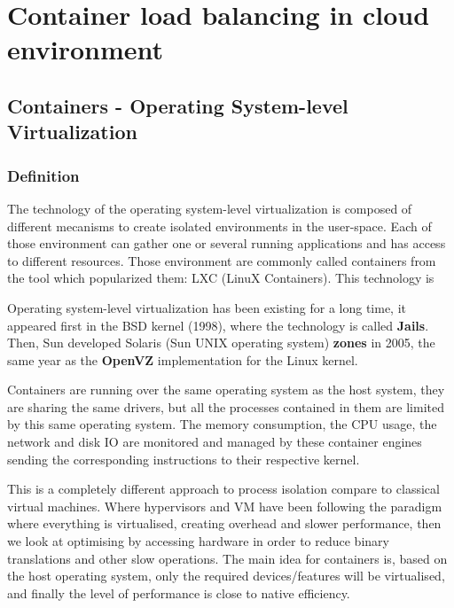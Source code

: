 \chapter{Container load balancing in cloud environment}
\label{mainidea}

\section{Containers - Operating System-level Virtualization}

\subsection{Definition}

The technology of the operating system-level virtualization is composed of
different mecanisms to create isolated environments in the user-space.  Each of
those environment can gather one or several running applications and has access
to different resources. Those environment are commonly called containers from
the tool which popularized them: LXC (LinuX Containers). This technology is 

Operating system-level virtualization has been existing for a long time, it
appeared first in the BSD kernel (1998), where the technology is called
\textbf{Jails}.  Then, Sun developed Solaris (Sun UNIX operating system)
\textbf{zones} in 2005, the same year as the \textbf{OpenVZ} implementation for
the Linux kernel.

Containers are running over the same operating system as the host system, they
are sharing the same drivers, but all the processes contained in them are
limited by this same operating system. The memory consumption, the CPU usage,
the network and disk IO are monitored and managed by these container engines
sending the corresponding instructions to their respective kernel. 

This is a completely different approach to process isolation compare to
classical virtual machines. Where hypervisors and VM have been following the
paradigm where everything is virtualised, creating overhead and slower
performance, then we look at optimising by accessing hardware in order to
reduce binary translations and other slow operations. The main idea for
containers is, based on the host operating system, only the required
devices/features will be virtualised, and finally the level of performance is
close to native efficiency.

